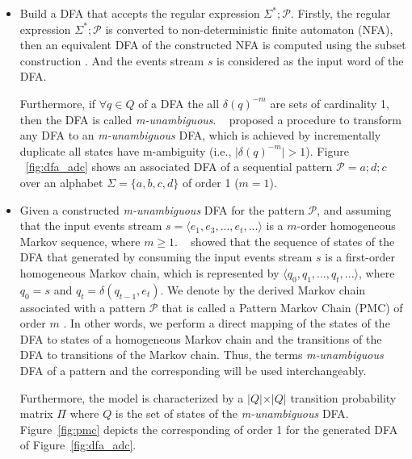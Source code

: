 \begin{itemize}[noitemsep]
	\item Build a DFA that accepts the regular expression $\Sigma^{*};\mathcal{P}$. Firstly, the regular expression $\Sigma^{*};\mathcal{P}$ is converted to non-deterministic finite automaton (NFA), then an equivalent DFA of the constructed NFA is computed using the subset construction \cite{hopcroft2006automata,alevizos2017event}. And the events stream $s$ is considered as the input word of the DFA. 

\par Furthermore, if $\forall q \in Q$ of a DFA the all $\delta(q)^{-m}$ are sets of cardinality 1, then the DFA is called \textit{m-unambiguous}. ~\citet{nuel_pattern_2008} proposed a procedure to transform any DFA to an \textit{m-unambiguous} DFA, which is achieved by incrementally duplicate all states have m-ambiguity (i.e., $\vert\delta(q)^{-m}\vert > 1$).   Figure ~\ref{fig:dfa_adc} shows an associated DFA of a sequential pattern $\mathcal{P}=a ; d ; c$ over an alphabet $\Sigma=\{a,b,c,d\}$ of order 1 ($m=1$). 





\item  Given a constructed \textit{m-unambiguous} DFA for the pattern $\mathcal{P}$, and  assuming that the input events stream $s=\langle e_1,e_3,...,e_t,...\rangle$ is a $m$-order homogeneous Markov sequence, where $m \geq 1$.  ~\citet{nuel_pattern_2008} showed that the sequence of states of the DFA that generated by consuming the input events stream $s$ is a first-order homogeneous Markov chain, which is represented by $\langle q_{0},q_{1},...,q_{t},...\rangle$, where $q_{0}=s$ and $q_{t}=\delta(q_{t-1},e_{t})$. We denote by \pmcmr the derived Markov chain associated with a pattern $\mathcal{P}$ that is called a Pattern Markov Chain (PMC) of order $m$ \cite{nuel_pattern_2008}. In other words, we perform a direct mapping of the states of the DFA to states of a homogeneous Markov chain and the transitions of the DFA to transitions of the Markov chain. Thus, the terms \textit{m-unambiguous} DFA of a pattern and the corresponding \pmcmr  will be used interchangeably. 

\par Furthermore, the \pmcmr model is characterized by a $\vert Q \vert \times \vert Q \vert$ transition probability matrix $\Pi$ where $Q$ is the set of states of the \textit{m-unambiguous} DFA. Figure~\ref{fig:pmc} depicts the corresponding \pmcmr of order 1 for the generated DFA of Figure~\ref{fig:dfa_adc}.


\end{itemize}
